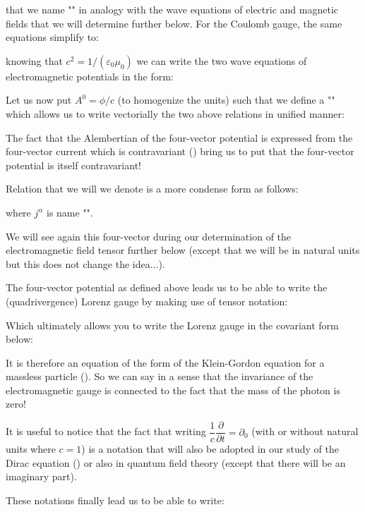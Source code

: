 	that we name "" in analogy with the wave equations of electric and magnetic fields that we will determine further below.
	For the Coulomb gauge, the same equations simplify to:
	
	knowing that $c^2=1/(\varepsilon_0\mu_0)$ we can write the two wave equations of electromagnetic potentials in the form:
	
	Let us now put $A^0=\phi/c$ (to homogenize the units) such that we define a "" which allows us to write vectorially the two above relations in unified manner:
	 
	\begin{tcolorbox}[title=Remark,colframe=black,arc=10pt]
	The fact that the Alembertian of the four-vector potential  is expressed from the four-vector current which is contravariant () bring us to put that the four-vector potential is itself contravariant!
	\end{tcolorbox}
	Relation that we will we denote is a more condense form as follows:
	
	where $j^\alpha$ is name "".
	\begin{tcolorbox}[title=Remark,colframe=black,arc=10pt]
	We will see again this four-vector during our determination of the electromagnetic field tensor further below (except that we will be in natural units but this does not change the idea...).
	\end{tcolorbox}
	The four-vector potential as defined above leads us to be able to write the (quadrivergence) Lorenz gauge by making use of tensor notation:
	
	Which ultimately allows you to write the Lorenz gauge in the covariant form below:
	
	It is therefore an equation of the form of the Klein-Gordon equation for a massless particle (). So we can say in a sense that the invariance of the electromagnetic gauge is connected to the fact that the mass of the photon is zero!
	\begin{tcolorbox}[title=Remark,colframe=black,arc=10pt]
	It is useful to notice that the fact that writing $\dfrac{1}{c}\dfrac{\partial }{\partial t}=\partial_0$ (with or without natural units where $c=1$) is a notation that will also be adopted in our study of the Dirac equation () or also in quantum field theory (except that there will be an imaginary part).
	\end{tcolorbox}
	These notations finally lead us to be able to write:
	
